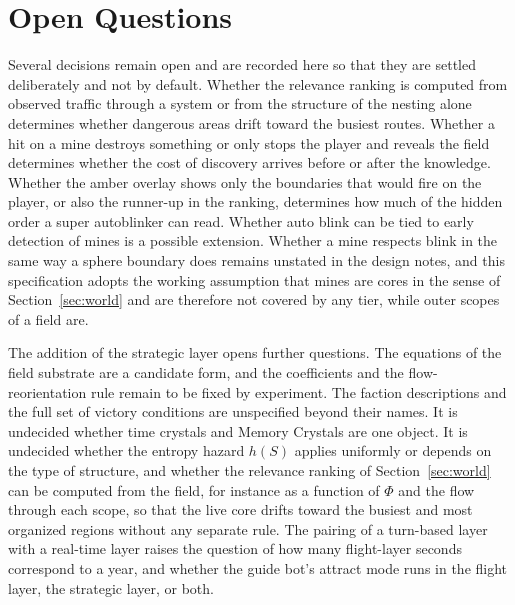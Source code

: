 \documentclass[11pt]{article}
\begin{document}
\section{Open Questions}

Several decisions remain open and are recorded here so that they are settled deliberately and not by default. Whether the relevance ranking is computed from observed traffic through a system or from the structure of the nesting alone determines whether dangerous areas drift toward the busiest routes. Whether a hit on a mine destroys something or only stops the player and reveals the field determines whether the cost of discovery arrives before or after the knowledge. Whether the amber overlay shows only the boundaries that would fire on the player, or also the runner-up in the ranking, determines how much of the hidden order a super autoblinker can read. Whether auto blink can be tied to early detection of mines is a possible extension. Whether a mine respects blink in the same way a sphere boundary does remains unstated in the design notes, and this specification adopts the working assumption that mines are cores in the sense of Section~\ref{sec:world} and are therefore not covered by any tier, while outer scopes of a field are.

The addition of the strategic layer opens further questions. The equations of the field substrate are a candidate form, and the coefficients and the flow-reorientation rule remain to be fixed by experiment. The faction descriptions and the full set of victory conditions are unspecified beyond their names. It is undecided whether time crystals and Memory Crystals are one object. It is undecided whether the entropy hazard $h(S)$ applies uniformly or depends on the type of structure, and whether the relevance ranking of Section~\ref{sec:world} can be computed from the field, for instance as a function of $\Phi$ and the flow through each scope, so that the live core drifts toward the busiest and most organized regions without any separate rule. The pairing of a turn-based layer with a real-time layer raises the question of how many flight-layer seconds correspond to a year, and whether the guide bot's attract mode runs in the flight layer, the strategic layer, or both.
\end{document}
